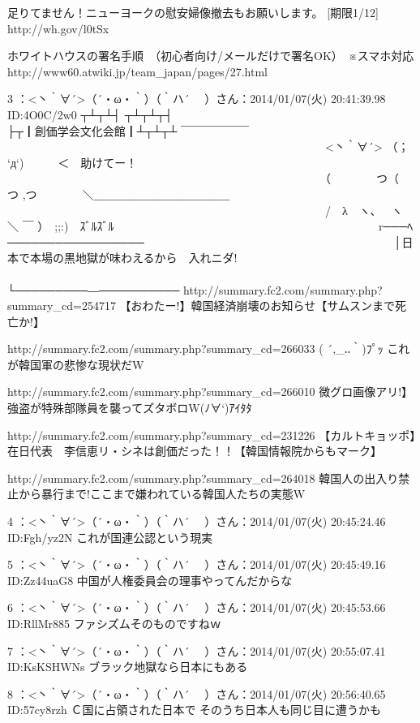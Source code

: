     足りてません！ニューヨークの慰安婦像撤去もお願いします。 [期限1/12]
    http://wh.gov/l0tSx

    ホワイトハウスの署名手順　（初心者向け/メールだけで署名OK）　※スマホ対応
    http://www60.atwiki.jp/team_japan/pages/27.html

3 ：<丶｀∀´>（´・ω・｀）（｀ハ´　 ）さん：2014/01/07(火) 20:41:39.98 ID:4O0C/2w0
    ┬┴┬┴┤
    ┬┴┬┴┬┤　　　　　　　　　　　　　　　　　　　　　　　　├┬┃創価学会文化会館┃┴┬┴┬┴
    ￣￣￣￣￣￣
    　　　　　　　　　　　　　　　　　　　　　　　　　　　　<丶｀∀´> （； ‘д‘)　　　＜　助けてー！
    　　　　　　　　　　　　　　　　　　　　　　　　　　　　（　　　　つ（　 つ ,つ　　　　＼＿＿＿＿＿＿＿＿＿＿＿＿
    　　　　　　　　　　　　　　　　　　　　　　　　　　　　/　λ　ヽ､　 ヽ　＼ ￣ ）　;;:)　ｽﾞﾙｽﾞﾙ
    　　　　　　　　　　　　　　　　　　　　　　　r───ﾍ─────────────────
    　　　　　　　　　　　　　　　　　　　　 　 │日本で本場の黒地獄が味わえるから　入れニダ!
    　　　　　　　　　　　　　　　　　　　　　 └─────────―──────────
    http://summary.fc2.com/summary.php?summary_cd=254717
    【おわたー!】韓国経済崩壊のお知らせ【サムスンまで死亡か!】

    http://summary.fc2.com/summary.php?summary_cd=266033
    ( ´,_‥｀)ﾌﾟｯ これが韓国軍の悲惨な現状だW

    http://summary.fc2.com/summary.php?summary_cd=266010
    微グロ画像アリ!】 強盗が特殊部隊員を襲ってズタボロW(ﾉ∀`)ｱｲﾀﾀ

    http://summary.fc2.com/summary.php?summary_cd=231226
    【カルトキョッポ】在日代表　李信恵リ・シネは創価だった！！【韓国情報院からもマーク】

    http://summary.fc2.com/summary.php?summary_cd=264018
    韓国人の出入り禁止から暴行まで!ここまで嫌われている韓国人たちの実態W

4 ：<丶｀∀´>（´・ω・｀）（｀ハ´　 ）さん：2014/01/07(火) 20:45:24.46 ID:Fgh/yz2N
    これが国連公認という現実

5 ：<丶｀∀´>（´・ω・｀）（｀ハ´　 ）さん：2014/01/07(火) 20:45:49.16 ID:Zz44uaG8
    中国が人権委員会の理事やってんだからな

6 ：<丶｀∀´>（´・ω・｀）（｀ハ´　 ）さん：2014/01/07(火) 20:45:53.66 ID:RllMr885
    ファシズムそのものですねｗ

7 ：<丶｀∀´>（´・ω・｀）（｀ハ´　 ）さん：2014/01/07(火) 20:55:07.41 ID:KsKSHWNs
    ブラック地獄なら日本にもある

8 ：<丶｀∀´>（´・ω・｀）（｀ハ´　 ）さん：2014/01/07(火) 20:56:40.65 ID:57cy8rzh
    Ｃ国に占領された日本で
    そのうち日本人も同じ目に遭うかも

